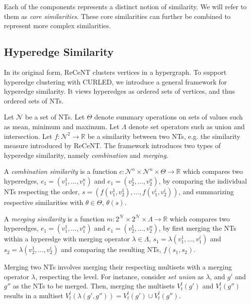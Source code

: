 Each of the components represents a distinct notion of similarity.
We will refer to them as \textit{core similarities}.
These core similarities can further be combined to represent more complex similarities.


\subsection{Hyperedge Similarity}

In its original form, ReCeNT clusters vertices in a hypergraph.
To support hyperedge clustering with CURLED, we introduce a general framework for hyperedge similarity.
It views hyperedges as ordered sets of vertices, and thus ordered sets of NTs.


Let $\mathcal{N}$ be a set of NTs.
Let $\Theta$ denote summary operations on sets of values such as mean, minimum and maximum.
Let $\Lambda$ denote set operators such as union and intersection.
Let $f: \mathcal{N}^2 \rightarrow \mathbb{R}$ be a similarity between two NTs, e.g. the similarity measure introduced by ReCeNT.
The framework introduces two types of hyperedge similarity, namely \textit{combination} and \textit{merging}.


\begin{definition}
A \textit{combination similarity} is a function $c: \mathcal{N}^n \times \mathcal{N}^n \times \Theta \rightarrow \mathbb{R}$ which compares two hyperedges, $e_1 = (v_1^1,..., v_1^n)$ and $e_1 = (v_2^1,..., v_2^n)$, by comparing the individual NTs respecting the order, $s = \left(f(v_1^1,v_2^1),\ldots,f(v_1^i,v_2^i) \right)$, and summarizing respective similarities with $\theta \in \Theta$,  $\theta(s)$. 
\end{definition}

\begin{definition}
A \textit{merging similarity} is a function $m: 2^{\mathcal{N}} \times 2^{\mathcal{N}} \times \Lambda \rightarrow \mathbb{R}$ which compares two hyperedges, $e_1 = (v_1^1,..., v_1^n)$ and $e_1 = (v_2^1,..., v_2^n)$, by first merging the NTs within a hyperedge with merging operator $\lambda \in \Lambda$, $s_1 = \lambda (v_1^1,\ldots,v_1^i)$ and $s_2 = \lambda (v_2^1,\ldots,v_2^i)$ and comparing the resulting NTs, $f(s_1,s_2)$.  
\end{definition}


Merging two NTs involves merging their respecting multisets with a merging operator $\lambda$, respecting the level.
For instance, consider \textit{set union} as $\lambda$, and $g'$ and $g''$ as the NTs to be merged.
Then, merging the multisets $V^l_{t}(g')$ and $V^l_{t}(g'')$ results in a multiset $V^l_{t}\left(\lambda(g',g'')\right) = V^l_{t}(g') \cup V^l_{t}(g'')$.



